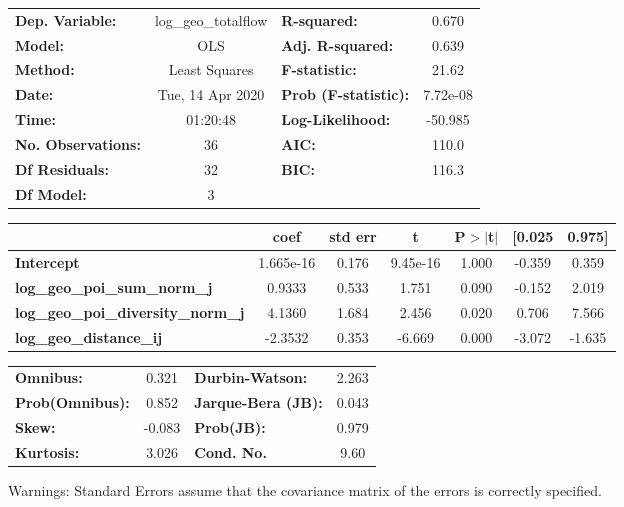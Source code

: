 \begin{center}
\begin{tabular}{lclc}
\toprule
\textbf{Dep. Variable:}                    & log\_geo\_totalflow & \textbf{  R-squared:         } &     0.670   \\
\textbf{Model:}                            &         OLS         & \textbf{  Adj. R-squared:    } &     0.639   \\
\textbf{Method:}                           &    Least Squares    & \textbf{  F-statistic:       } &     21.62   \\
\textbf{Date:}                             &   Tue, 14 Apr 2020  & \textbf{  Prob (F-statistic):} &  7.72e-08   \\
\textbf{Time:}                             &       01:20:48      & \textbf{  Log-Likelihood:    } &   -50.985   \\
\textbf{No. Observations:}                 &            36       & \textbf{  AIC:               } &     110.0   \\
\textbf{Df Residuals:}                     &            32       & \textbf{  BIC:               } &     116.3   \\
\textbf{Df Model:}                         &             3       & \textbf{                     } &             \\
\bottomrule
\end{tabular}
\begin{tabular}{lcccccc}
                                           & \textbf{coef} & \textbf{std err} & \textbf{t} & \textbf{P$> |$t$|$} & \textbf{[0.025} & \textbf{0.975]}  \\
\midrule
\textbf{Intercept}                         &    1.665e-16  &        0.176     &  9.45e-16  &         1.000        &       -0.359    &        0.359     \\
\textbf{log\_geo\_poi\_sum\_norm\_j}       &       0.9333  &        0.533     &     1.751  &         0.090        &       -0.152    &        2.019     \\
\textbf{log\_geo\_poi\_diversity\_norm\_j} &       4.1360  &        1.684     &     2.456  &         0.020        &        0.706    &        7.566     \\
\textbf{log\_geo\_distance\_ij}            &      -2.3532  &        0.353     &    -6.669  &         0.000        &       -3.072    &       -1.635     \\
\bottomrule
\end{tabular}
\begin{tabular}{lclc}
\textbf{Omnibus:}       &  0.321 & \textbf{  Durbin-Watson:     } &    2.263  \\
\textbf{Prob(Omnibus):} &  0.852 & \textbf{  Jarque-Bera (JB):  } &    0.043  \\
\textbf{Skew:}          & -0.083 & \textbf{  Prob(JB):          } &    0.979  \\
\textbf{Kurtosis:}      &  3.026 & \textbf{  Cond. No.          } &     9.60  \\
\bottomrule
\end{tabular}
\end{center}

Warnings: \newline
 [1] Standard Errors assume that the covariance matrix of the errors is correctly specified.
